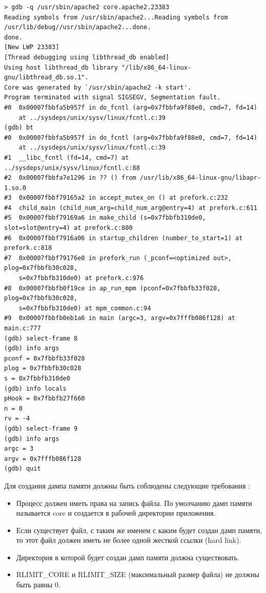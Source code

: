 \documentclass[20pt]{article}
\begin{document}
\begin{lstlisting}[caption={Анализ дампа памяти в gdb},label={gdb-core-dump},breaklines]
> gdb -q /usr/sbin/apache2 core.apache2.23383
Reading symbols from /usr/sbin/apache2...Reading symbols from /usr/lib/debug//usr/sbin/apache2...done.
done.
[New LWP 23383]
[Thread debugging using libthread_db enabled]
Using host libthread_db library "/lib/x86_64-linux-gnu/libthread_db.so.1".
Core was generated by `/usr/sbin/apache2 -k start'.
Program terminated with signal SIGSEGV, Segmentation fault.
#0  0x00007fbbfa5b957f in do_fcntl (arg=0x7fbbfa9f88e0, cmd=7, fd=14)
    at ../sysdeps/unix/sysv/linux/fcntl.c:39
(gdb) bt
#0  0x00007fbbfa5b957f in do_fcntl (arg=0x7fbbfa9f88e0, cmd=7, fd=14)
    at ../sysdeps/unix/sysv/linux/fcntl.c:39
#1  __libc_fcntl (fd=14, cmd=7) at ../sysdeps/unix/sysv/linux/fcntl.c:88
#2  0x00007fbbfa7e1296 in ?? () from /usr/lib/x86_64-linux-gnu/libapr-1.so.0
#3  0x00007fbbf79165a2 in accept_mutex_on () at prefork.c:232
#4  child_main (child_num_arg=child_num_arg@entry=4) at prefork.c:611
#5  0x00007fbbf79169a6 in make_child (s=0x7fbbfb310de0, slot=slot@entry=4) at prefork.c:800
#6  0x00007fbbf7916a06 in startup_children (number_to_start=1) at prefork.c:818
#7  0x00007fbbf79176e0 in prefork_run (_pconf=<optimized out>, plog=0x7fbbfb30c028,
    s=0x7fbbfb310de0) at prefork.c:976
#8  0x00007fbbfb0f19ce in ap_run_mpm (pconf=0x7fbbfb33f028, plog=0x7fbbfb30c028,
    s=0x7fbbfb310de0) at mpm_common.c:94
#9  0x00007fbbfb0eb1a6 in main (argc=3, argv=0x7fffb086f128) at main.c:777
(gdb) select-frame 8
(gdb) info args
pconf = 0x7fbbfb33f028
plog = 0x7fbbfb30c028
s = 0x7fbbfb310de0
(gdb) info locals
pHook = 0x7fbbfb27f660
n = 0
rv = -4
(gdb) select-frame 9
(gdb) info args
argc = 3
argv = 0x7fffb086f128
(gdb) quit
\end{lstlisting}

Для создания дампа памяти должны быть соблюдены следующие требования \cite{man/coredump}:
\begin{itemize}
  \item Процесс должен иметь права на запись файла. По умолчанию дамп памяти
  называется core и создается в рабочей директории приложения.
  \item Если существует файл, с таким же именем с каким будет создан дамп памяти,
  то этот файл должен иметь не более одной жесткой ссылки (hard link).
  \item Директория в которой будет создан дамп памяти должна существовать.
  \item RLIMIT\_CORE и RLIMIT\_SIZE (максимальный размер файла) не должны быть равны 0.
\end{itemize}
\end{document}
